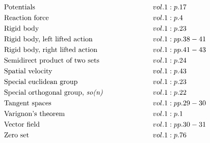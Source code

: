 \documentclass[a4paper]{article}
\begin{document}
\begin{align*}
&\text{Potentials} \hspace*{6em}&& vol. 1: p. 17\\
&\text{Reaction force} \hspace*{6em}&& vol. 1: p. 4\\
&\text{Rigid body} \hspace*{6em}&& vol. 1: p. 23\\
&\text{Rigid body, left lifted action} \hspace*{6em}&& vol. 1: pp. 38-41\\
&\text{Rigid body, right lifted action} \hspace*{6em}&& vol. 1: pp. 41-43\\
&\text{Semidirect product of two sets} \hspace*{6em}&& vol. 1: p. 24\\
&\text{Spatial velocity} \hspace*{6em}&& vol. 1: p. 43\\
&\text{Special euclidean group} \hspace*{6em}&& vol. 1: p. 23\\
&\text{Special orthogonal group, \emph{so(n)}} \hspace*{6em}&& vol. 1: p. 22\\
&\text{Tangent spaces} \hspace*{6em}&& vol. 1: pp. 29-30\\
&\text{Varignon's theorem} \hspace*{6em}&& vol. 1: p. 1\\
&\text{Vector field} \hspace*{6em}&& vol. 1: pp. 30-31\\
&\text{Zero set} \hspace*{6em}&& vol. 1: p. 76\\
\end{align*} 
\end{document}
